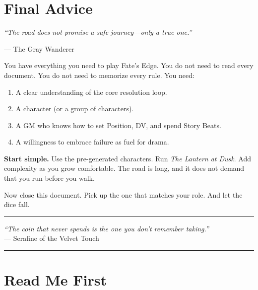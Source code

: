 \documentclass[10pt]{article}
\begin{document}
\newpage

\section*{Final Advice}

\begin{center}
\itshape
``The road does not promise a safe journey---only a true one.''

\vspace{0.5cm}
--- The Gray Wanderer
\end{center}

\vspace{1cm}

You have everything you need to play Fate's Edge. You do not need to read every document. You do not need to memorize every rule. You need:

\begin{enumerate}
\item A clear understanding of the core resolution loop.
\item A character (or a group of characters).
\item A GM who knows how to set Position, DV, and spend Story Beats.
\item A willingness to embrace failure as fuel for drama.
\end{enumerate}

\textbf{Start simple.} Use the pre-generated characters. Run \textit{The Lantern at Dusk}. Add complexity as you grow comfortable. The road is long, and it does not demand that you run before you walk.

\vspace{0.5cm}

Now close this document. Pick up the one that matches your role. And let the dice fall.

\vspace{1cm}

\begin{center}
\rule{0.6\textwidth}{0.5pt}

\textit{``The coin that never spends is the one you don't remember taking.''} \\
--- Serafine of the Velvet Touch

\rule{0.6\textwidth}{0.5pt}
\end{center}

\newpage

\section*{Read Me First}
\end{document}
